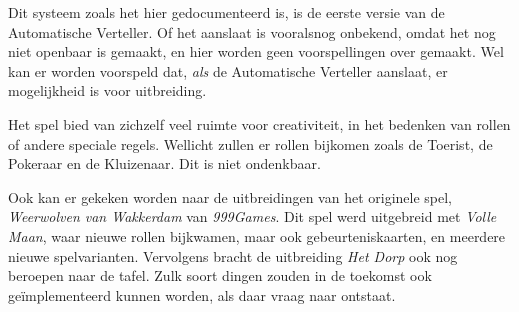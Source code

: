 \documentclass[12pt]{article}
\begin{document}
  Dit systeem zoals het hier gedocumenteerd is, is de eerste versie van de Automatische Verteller. Of het aanslaat is vooralsnog onbekend, omdat het nog niet openbaar is gemaakt, en hier worden geen voorspellingen over gemaakt. Wel kan er worden voorspeld dat, \emph{als} de Automatische Verteller aanslaat, er mogelijkheid is voor uitbreiding. 
  
  Het spel bied van zichzelf veel ruimte voor creativiteit, in het bedenken van rollen of andere speciale regels. Wellicht zullen er rollen bijkomen zoals de Toerist, de Pokeraar en de Kluizenaar. Dit is niet ondenkbaar.
  
  Ook kan er gekeken worden naar de uitbreidingen van het originele spel, \emph{Weerwolven van Wakkerdam} van \emph{999Games}. Dit spel werd uitgebreid met \emph{Volle Maan}, waar nieuwe rollen bijkwamen, maar ook gebeurteniskaarten, en meerdere nieuwe spelvarianten. Vervolgens bracht de uitbreiding \emph{Het Dorp} ook nog beroepen naar de tafel. Zulk soort dingen zouden in de toekomst ook ge\"implementeerd kunnen worden, als daar vraag naar ontstaat.
\end{document}
